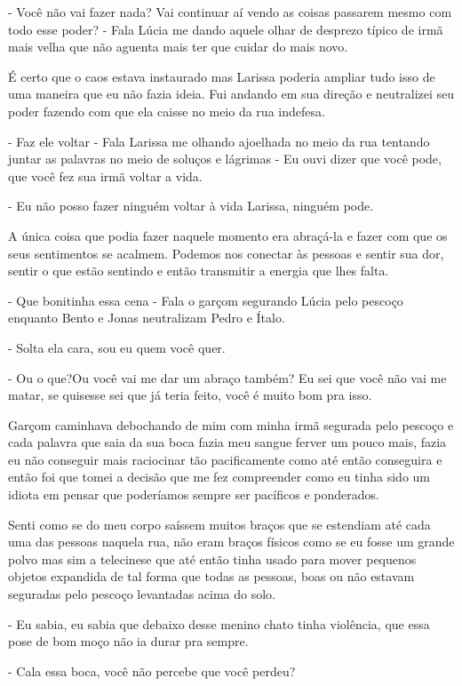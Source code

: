 - Você não vai fazer nada? Vai continuar aí vendo as coisas passarem mesmo com todo esse poder? - Fala Lúcia me dando aquele olhar de desprezo típico de irmã mais velha que não aguenta mais ter que cuidar do mais novo.

É certo que o caos estava instaurado mas Larissa poderia ampliar tudo isso de uma maneira que eu não fazia ideia. Fui andando em sua direção e neutralizei seu poder fazendo com que ela caisse no meio da rua indefesa.

- Faz ele voltar - Fala Larissa me olhando ajoelhada no meio da rua tentando juntar as palavras no meio de soluços e lágrimas - Eu ouvi dizer que você pode, que você fez sua irmã voltar a vida.

- Eu não posso fazer ninguém voltar à vida Larissa, ninguém pode.

A única coisa que podia fazer naquele momento era abraçá-la e fazer com que os seus sentimentos se acalmem. Podemos nos conectar às pessoas e sentir sua dor, sentir o que estão sentindo e então transmitir a energia que lhes falta.

- Que bonitinha essa cena - Fala o garçom segurando Lúcia pelo pescoço enquanto Bento e Jonas neutralizam Pedro e Ítalo.

- Solta ela cara, sou eu quem você quer.

- Ou o que?Ou você vai me dar um abraço também? Eu sei que você não vai me matar, se quisesse sei que já teria feito, você é muito bom pra isso.

Garçom caminhava debochando de mim com minha irmã segurada pelo pescoço e cada palavra que saia da sua boca fazia meu sangue ferver um pouco mais, fazia eu não conseguir mais raciocinar tão pacificamente como até então conseguira e então foi que tomei a decisão que me fez compreender como eu tinha sido um idiota em pensar que poderíamos sempre ser pacíficos e ponderados.

Senti como se do meu corpo saíssem muitos braços que se estendiam até cada uma das pessoas naquela rua, não eram braços físicos como se eu fosse um grande polvo mas sim a telecinese que até então tinha usado para mover pequenos objetos expandida de tal forma que todas as pessoas, boas ou não estavam seguradas pelo pescoço levantadas acima do solo.

- Eu sabia, eu sabia que debaixo desse menino chato tinha violência, que essa pose de bom moço não ia durar pra sempre.

- Cala essa boca, você não percebe que você perdeu?

